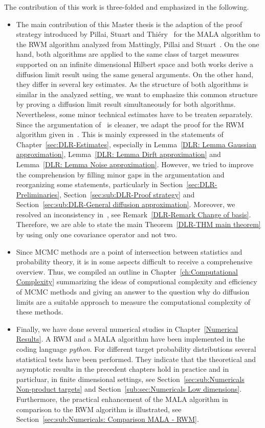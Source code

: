 The contribution of this work is three-folded and emphasized in the following.
\begin{itemize}
 \item The main contribution of this Master thesis is the adaption of the proof strategy introduced by Pillai, Stuart and Thi\'{e}ry~\autocite{Pillai2012} for the MALA algorithm to the RWM algorithm analyzed from Mattingly, Pillai and Stuart~\autocite{Mattingly2010}. On the one hand, both algorithms are applied to the same class of target measures supported on an infinite dimensional Hilbert space and both works derive a diffusion limit result using the same general arguments. On the other hand, they differ in several key estimates. As the structure of both algorithms is similar in the analyzed setting, we want to emphasize this common structure by proving a diffusion limit result simultaneously for both algorithms. Nevertheless, some minor technical estimates have to be treaten separately. Since the argumentation of~\autocite{Pillai2012} is cleaner, we adapt the proof for the RWM algorithm given in~\autocite{Mattingly2010}. This is mainly expressed in the statements of Chapter~\ref{sec:DLR-Estimates}, especially in Lemma~\ref{DLR: Lemma Gaussian approximation}, Lemma~\ref{DLR: Lemma Dirft approximation} and Lemma~\ref{DLR: Lemma Noise approximation}. However, we tried to improve the comprehension by filling minor gaps in the argumentation and reorganizing some statements, particularly in Section~\ref{sec:DLR-Preliminaries}, Section~\ref{sec:sub:DLR-Proof strategy} and Section~\ref{sec:sub:DLR-General diffusion approximation}. Moreover, we resolved an inconsistency in~\autocite{Pillai2012}, see Remark~\ref{DLR-Remark Change of basis}. Therefore, we are able to state the main Theorem~\ref{DLR-THM main theorem} by using only one covariance operator and not two.
 \item Since MCMC methods are a point of intersection between statistics and probability theory, it is in some aspects difficult to receive a comprehensive overview. Thus, we compiled an outline in Chapter~\ref{ch:Computational Complexity} summarizing the ideas of computional complexity and efficiency of MCMC methods and giving an answer to the question why do diffusion limits are a suitable approach to measure the computational complexity of these methods.
 \item Finally, we have done several numerical studies in Chapter~\ref{Numerical Results}. A RWM and a MALA algorithm have been implemented in the coding language \textit{python}. For different target probability distributions several statistical tests have been performed. They indicate that the theoretical and asymptotic results in the precedent chapters hold in practice and in particluar, in finite dimensional settings, see Section~\ref{sec:sub:Numericals Non-product targets} and Section~\ref{sub:sec:Numericals Low dimensions}. Furthermore, the practical enhancement of the MALA algorithm in comparison to the RWM algorithm is illustrated, see Section~\ref{sec:sub:Numericals: Comparison MALA - RWM}.
\end{itemize}


